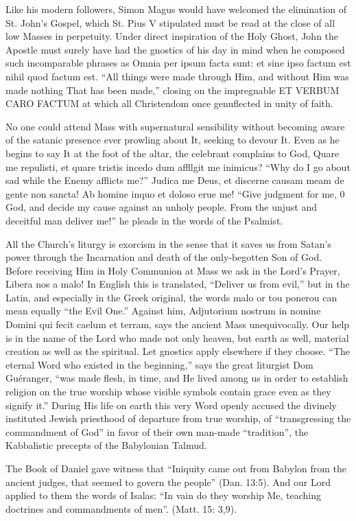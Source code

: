 Like his modern followers, Simon Magus would have welcomed the elimination of St. John's Gospel, which St. Pius V stipulated must be read at the close of all low Masses in perpetuity. Under direct inspiration of the Holy Ghost, John the Apostle must surely have had the gnostics of his day in mind when he composed such incomparable phrases as Omnia per ipsum facta sunt: et sine ipso factum est nihil quod factum est. ``All things were made through Him, and without Him was made nothing That has been made,'' closing on the impregnable ET VERBUM CARO FACTUM at which all Christendom once genuflected in unity of faith.

No one could attend Mass with supernatural sensibility without becoming aware of the satanic presence ever prowling about It, seeking to devour It. Even as he begins to say It at the foot of the altar, the celebrant complains to God, Quare me repulisti, et quare tristis incedo dum affllgit me inimicus? ``Why do I go about sad while the Enemy afflicts me?'' Judica me Deus, et discerne causam meam de gente non sancta! Ab homine inquo et doloso erue me! ``Give judgment for me, 0 God, and decide my cause against an unholy people. From the unjust and deceitful man deliver me!'' he pleads in the words of the Psalmist.

All the Church's liturgy is exorcism in the sense that it saves us from Satan's power through the Incarnation and death of the only-begotten Son of God. Before receiving Him in Holy Communion at Mass we ask in the Lord's Prayer, Libera nos a malo! In English this is translated, ``Deliver us from evil,'' but in the Latin, and especially in the Greek original, the words malo or tou ponerou can mean equally ``the Evil One.'' Against him, Adjutorium nostrum in nomine Domini qui fecit caelum et terram, says the ancient Mass unequivocally. Our help is in the name of the Lord who made not only heaven, but earth as well, material creation as well as the spiritual. Let gnostics apply elsewhere if they choose. ``The eternal Word who existed in the beginning,'' says the great liturgist Dom Guéranger, ``was made flesh, in time, and He lived among us in order to establish religion on the true worship whose visible symbols contain grace even as they signify it.'' During His life on earth this very Word openly accused the divinely instituted Jewish priesthood of departure from true worship, of ``transgressing the commandment of God'' in favor of their own man-made ``tradition'', the Kabbalistic precepts of the Babylonian Talmud.

The Book of Daniel gave witness that ``Iniquity came out from Babylon from the ancient judges, that seemed to govern the people'' (Dan. 13:5). And our Lord applied to them the words of Isalas: ``In vain do they worship Me, teaching doctrines and commandments of men''. (Matt. 15: 3,9).

